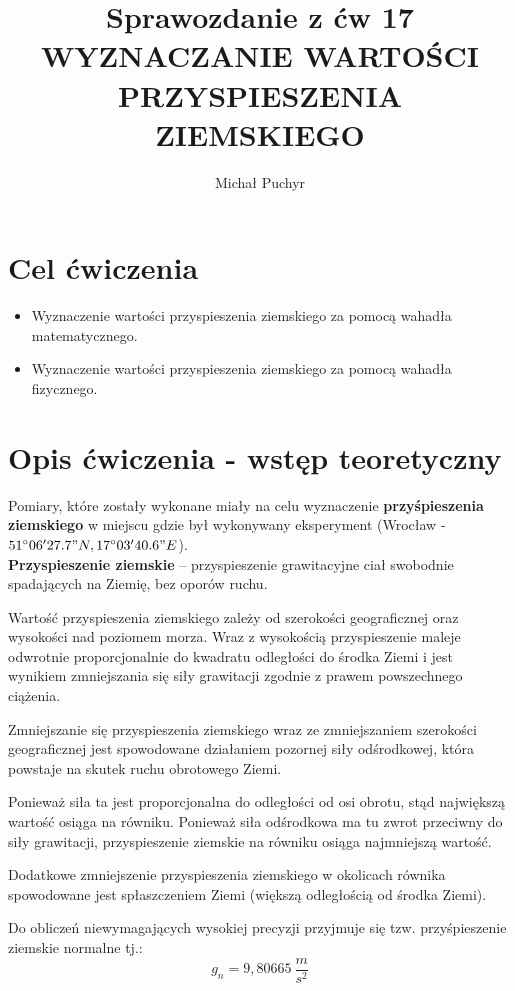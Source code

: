 \documentclass[12pt]{article}
\author{Michał Puchyr}
\title{Sprawozdanie z ćw 17 \\
WYZNACZANIE WARTOŚCI PRZYSPIESZENIA ZIEMSKIEGO}
\begin{document}
\maketitle

\section{Cel ćwiczenia}

\begin{itemize}
    \item Wyznaczenie wartości przyspieszenia ziemskiego za pomocą wahadła matematycznego.
    \item Wyznaczenie wartości przyspieszenia ziemskiego za pomocą wahadła fizycznego.
\end{itemize}

\section{Opis ćwiczenia - wstęp teoretyczny}

Pomiary, które zostały wykonane miały na celu wyznaczenie \textbf{przyśpieszenia ziemskiego} w miejscu
gdzie był wykonywany eksperyment (Wrocław - $51^{\circ}06'27.7" N, 17^{\circ}03'40.6" E$). \\

\textbf{Przyspieszenie ziemskie} -- przyspieszenie grawitacyjne ciał swobodnie spadających na Ziemię, bez oporów ruchu.

Wartość przyspieszenia ziemskiego zależy od szerokości geograficznej oraz wysokości nad poziomem morza. 
Wraz z wysokością przyspieszenie maleje odwrotnie proporcjonalnie do kwadratu odległości do środka Ziemi 
i jest wynikiem zmniejszania się siły grawitacji zgodnie z prawem powszechnego ciążenia. 

Zmniejszanie się przyspieszenia ziemskiego wraz ze zmniejszaniem szerokości geograficznej 
jest spowodowane działaniem pozornej siły odśrodkowej, która powstaje na skutek ruchu obrotowego Ziemi. 

Ponieważ siła ta jest proporcjonalna do odległości od osi obrotu, stąd największą wartość osiąga na równiku. 
Ponieważ siła odśrodkowa ma tu zwrot przeciwny do siły grawitacji, 
przyspieszenie ziemskie na równiku osiąga najmniejszą wartość. 

Dodatkowe zmniejszenie przyspieszenia ziemskiego w okolicach równika spowodowane jest spłaszczeniem Ziemi 
(większą odległością od środka Ziemi).

Do obliczeń niewymagających wysokiej precyzji przyjmuje się tzw. przyśpieszenie ziemskie normalne tj.:
$$ g_n = 9,80665 \ \frac{m}{s^2} $$
\end{document}
